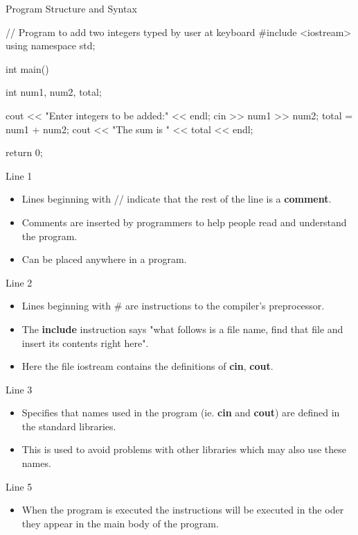 \documentclass[../lecture1-introduction.tex]{subfiles}
\begin{document}
\begin{frame}[fragile]{Program Structure and Syntax}
\begin{cppcode}[]
// Program to add two integers typed by user at keyboard
#include <iostream>
using namespace std;

int main()
{
    int num1, num2, total;

    cout << "Enter integers to be added:" << endl;
    cin >> num1 >> num2;
    total = num1 + num2;
    cout << "The sum is " << total << endl;

    return 0;
}
\end{cppcode}
    {
        Line 1
        \begin{itemize}
            \item Lines beginning with // indicate that the rest of the line
            is a \textbf{comment}.
            \item Comments are inserted by programmers to help people read
            and understand the program.
            \item Can be placed anywhere in a program.
        \end{itemize}
    }
    {
        Line 2
        \begin{itemize}
            \item Lines beginning with \# are instructions to the compiler's
            preprocessor.
            \item The \textbf{include} instruction says "what follows is a file name,
            find that file and insert its contents right here".
            \item Here the file iostream contains the definitions of
            \textbf{cin}, \textbf{cout}.
        \end{itemize}
    }
    {
        Line 3
        \begin{itemize}
            \item Specifies that names used in the program (ie. \textbf{cin} and
            \textbf{cout}) are defined in the standard libraries.
            \item This is used to avoid problems with other libraries which may
            also use these names.
        \end{itemize}
    }
    {
        Line 5
        \begin{itemize}
            \item When the program is executed the instructions will be executed
            in the oder they appear in the main body of the program.

\end{itemize}}
\end{frame}
\end{document}
